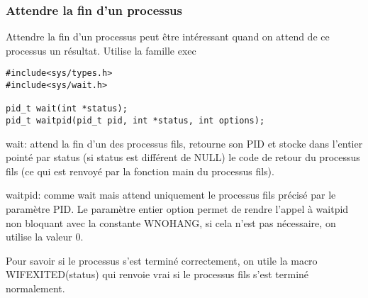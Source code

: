 \documentclass[a4paper]{article}
\begin{document}
\subsubsection{Attendre la fin d'un processus}
Attendre la fin d'un processus peut être intéressant quand on attend de ce processus un résultat.\newline
Utilise la famille exec\newline
\begin{lstlisting}
#include<sys/types.h>
#include<sys/wait.h>

pid_t wait(int *status);
pid_t waitpid(pid_t pid, int *status, int options);
\end{lstlisting}
wait: attend la fin d'un des processus fils, retourne son PID et stocke dans l'entier pointé par status (si status est différent de NULL) le code de retour du processus fils (ce qui est renvoyé par la fonction main du processus fils).\par{}
waitpid: comme wait mais attend uniquement le processus fils précisé par le paramètre PID.  Le paramètre entier \guillemotleft{}option\guillemotright{} permet de rendre l'appel à waitpid non bloquant avec la constante WNOHANG, si cela n'est pas nécessaire, on utilise la valeur 0.
\par{}
Pour savoir si le processus s'est terminé correctement, on utile la macro WIFEXITED(status) qui renvoie vrai si le processus fils s'est terminé normalement.\newline
\end{document}

